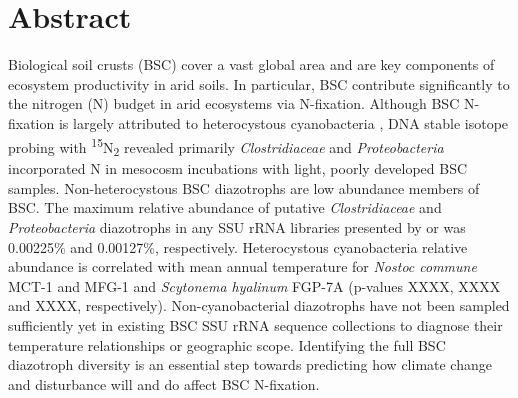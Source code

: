 \section{Abstract}
Biological soil crusts (BSC) cover a vast global area and are key components of ecosystem productivity in arid soils. In particular, BSC contribute significantly to the nitrogen (N) budget in arid ecosystems via N-fixation. Although BSC N-fixation is largely attributed to heterocystous cyanobacteria \cite{Yeager, 14766579, Yeager_2012}, DNA stable isotope probing with \textsuperscript{15}N\textsubscript{2} revealed primarily \textit{Clostridiaceae} and \textit{Proteobacteria} incorporated N in mesocosm incubations with light, poorly developed BSC samples. Non-heterocystous BSC diazotrophs are low abundance members of BSC. The maximum relative abundance of putative \textit{Clostridiaceae} and \textit{Proteobacteria} diazotrophs in any SSU rRNA libraries presented by \citet{Garcia_Pichel_2013} or \citet{Steven_2013} was 0.00225\% and 0.00127\%, respectively. Heterocystous cyanobacteria relative abundance is correlated with mean annual temperature for \textit{Nostoc commune} MCT-1 and MFG-1 and \textit{Scytonema hyalinum} FGP-7A (p-values XXXX, XXXX and XXXX, respectively). Non-cyanobacterial diazotrophs have not been sampled sufficiently yet in existing BSC SSU rRNA sequence collections to diagnose their temperature relationships or geographic scope. Identifying the full BSC diazotroph diversity is an essential step towards predicting how climate change and disturbance will and do affect BSC N-fixation.